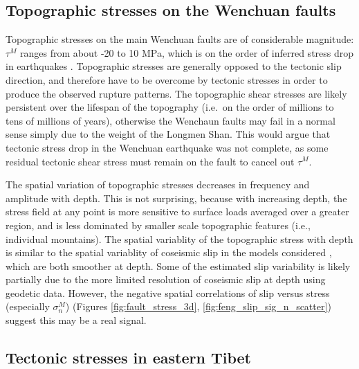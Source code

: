 \documentclass[twocolumn,jgrga]{AGUTeX}
\begin{document}
\begin{article}
\subsection{Topographic stresses on the Wenchuan
faults}\label{topographic-stresses-on-the-wenchuan-faults}

Topographic stresses on the main Wenchuan faults are of considerable
magnitude: $\tau^M$ ranges from about -20 to 10 MPa, which is on the
order of inferred stress drop in earthquakes \citep[e.g.,][]{kanamori1975,
allmann2009}. Topographic stresses are
generally opposed to the tectonic slip direction, and therefore have to
be overcome by tectonic stresses in order to produce the observed
rupture patterns. The topographic shear stresses are likely persistent
over the lifespan of the topography (i.e.~on the order of millions to
tens of millions of years), otherwise the Wenchaun faults may fail in a
normal sense simply due to the weight of the Longmen Shan. This would
argue that tectonic stress drop in the Wenchuan earthquake was not
complete, as some residual tectonic shear stress must remain on the
fault to cancel out $\tau^M$.

The spatial variation of topographic stresses decreases in frequency and
amplitude with depth. This is not surprising, because with increasing
depth, the stress field at any point is more sensitive to surface loads
averaged over a greater region, and is less dominated by smaller scale
topographic features (i.e., individual mountains). The spatial
variablity of the topographic stress with depth is similar to the spatial
variablity of coseismic slip in the models considered \citep[e.g.,][]
{zhang2011}, which are both smoother at depth. Some of the
estimated slip variability is likely partially due to the more limited
resolution of coseismic slip at depth using geodetic data.
However, the negative spatial correlations of slip versus stress
(especially $\sigma^M_n$) (Figures \ref{fig:fault_stress_3d},
\ref{fig:feng_slip_sig_n_scatter}) suggest this may be a real signal.

\subsection{Tectonic stresses in eastern
Tibet}\label{tectonic-stresses-in-eastern-tibet}


\end{article}
\end{document}
